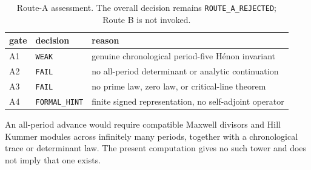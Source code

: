 \begin{table}[h]
\centering
\small
\begin{tabular}{lll}
\toprule
gate & decision & reason \\
\midrule
A1 & \texttt{WEAK} & genuine chronological period-five H\'enon invariant \\
A2 & \texttt{FAIL} & no all-period determinant or analytic continuation \\
A3 & \texttt{FAIL} & no prime law, zero law, or critical-line theorem \\
A4 & \texttt{FORMAL\_HINT} & finite signed representation, no self-adjoint operator \\
\bottomrule
\end{tabular}
\caption{Route-A assessment.  The overall decision remains
\texttt{ROUTE\_A\_REJECTED}; Route B is not invoked.}
\label{tab:route-a}
\end{table}

An all-period advance would require compatible Maxwell divisors and Hill
Kummer modules across infinitely many periods, together with a chronological
trace or determinant law.  The present computation gives no such tower and
does not imply that one exists.
